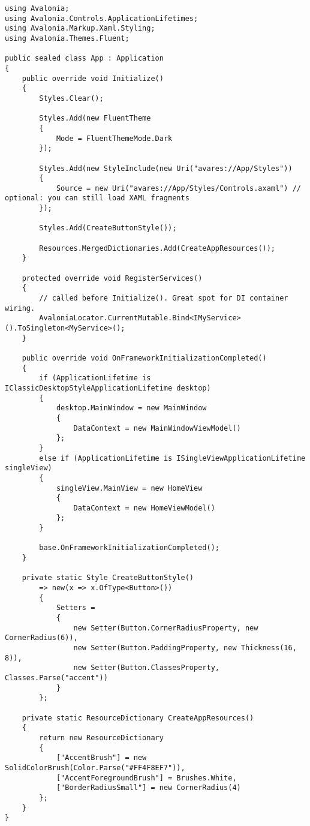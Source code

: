 \begin{lstlisting}
using Avalonia;
using Avalonia.Controls.ApplicationLifetimes;
using Avalonia.Markup.Xaml.Styling;
using Avalonia.Themes.Fluent;

public sealed class App : Application
{
    public override void Initialize()
    {
        Styles.Clear();

        Styles.Add(new FluentTheme
        {
            Mode = FluentThemeMode.Dark
        });

        Styles.Add(new StyleInclude(new Uri("avares://App/Styles"))
        {
            Source = new Uri("avares://App/Styles/Controls.axaml") // optional: you can still load XAML fragments
        });

        Styles.Add(CreateButtonStyle());

        Resources.MergedDictionaries.Add(CreateAppResources());
    }

    protected override void RegisterServices()
    {
        // called before Initialize(). Great spot for DI container wiring.
        AvaloniaLocator.CurrentMutable.Bind<IMyService>().ToSingleton<MyService>();
    }

    public override void OnFrameworkInitializationCompleted()
    {
        if (ApplicationLifetime is IClassicDesktopStyleApplicationLifetime desktop)
        {
            desktop.MainWindow = new MainWindow
            {
                DataContext = new MainWindowViewModel()
            };
        }
        else if (ApplicationLifetime is ISingleViewApplicationLifetime singleView)
        {
            singleView.MainView = new HomeView
            {
                DataContext = new HomeViewModel()
            };
        }

        base.OnFrameworkInitializationCompleted();
    }

    private static Style CreateButtonStyle()
        => new(x => x.OfType<Button>())
        {
            Setters =
            {
                new Setter(Button.CornerRadiusProperty, new CornerRadius(6)),
                new Setter(Button.PaddingProperty, new Thickness(16, 8)),
                new Setter(Button.ClassesProperty, Classes.Parse("accent"))
            }
        };

    private static ResourceDictionary CreateAppResources()
    {
        return new ResourceDictionary
        {
            ["AccentBrush"] = new SolidColorBrush(Color.Parse("#FF4F8EF7")),
            ["AccentForegroundBrush"] = Brushes.White,
            ["BorderRadiusSmall"] = new CornerRadius(4)
        };
    }
}
\end{lstlisting}

